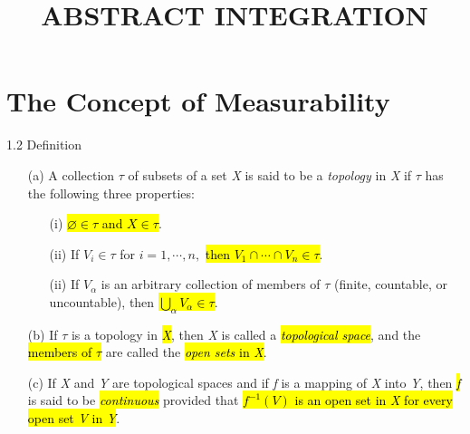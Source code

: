 \documentclass{article}
\title{ABSTRACT INTEGRATION}
\begin{document}
\maketitle

\section*{The Concept of Measurability}

\begin{defi}{1.2 Definition}
	\begin{enumerate}
  \item [(a)]
  A collection $\tau$ of subsets of a set \textit{X} is said to be a \textit{topology} in \textit{X} if $\tau$ has the following three properties:
  \begin{enumerate}
  \item [(i)] \hl{$\varnothing\in\tau$ and $X\in\tau$}.
  \item [(ii)] If $V_i\in\tau$ for $i=1,\cdots,n,$ \hl{then $V_1\cap\cdots\cap V_n\in\tau$}.
  \item [(ii)] If ${V_\alpha}$ is an arbitrary collection of members of $\tau$ (finite, countable, or uncountable), then \hl{$\bigcup_\alpha V_\alpha\in\tau$}.
\end{enumerate}
  \item [(b)] If $\tau$ is a topology in \hl{\textit{X}}, then \textit{X} is called a \hl{\textit{topological space}}, and the \hl{members of $\tau$} are called the \hl{\textit{open sets} in \textit{X}}.
  \item [(c)] If \textit{X} and \textit{Y} are topological spaces and if \textit{f} is a mapping of \textit{X} into \textit{Y}, then \hl{\textit{f}} is said to be \hl{\textit{continuous}} provided that \hl{$f^{-1}(V)$ is an open set in \textit{X} for every open set \textit{V} in \textit{Y}}. 

\end{enumerate}

\end{defi}
\end{document}
